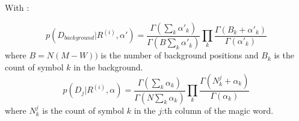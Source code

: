 With : 

\begin{equation}
p(D_{background}|R^{(i)}, \alpha') = \frac{\Gamma(\sum_k \alpha'_k)}{\Gamma(B \sum_k \alpha'_k)} \prod_k \frac{\Gamma(B_k + \alpha'_k)}{\Gamma(\alpha'_k)}
\end{equation}
where $B = N(M-W))$ is the number of background positions and $B_k$ is the count of symbol $k$ in the background.
\begin{equation}
p(D_{j}|R^{(i)},\alpha) = \frac{\Gamma(\sum_k \alpha_k)}{\Gamma(N \sum_k \alpha_k)} \prod_k \frac{\Gamma(N^j_k + \alpha_k)}{\Gamma(\alpha_k)}
\end{equation}
where $N^j_k$ is the count of symbol $k$ in the $j$:th column of the magic word.
